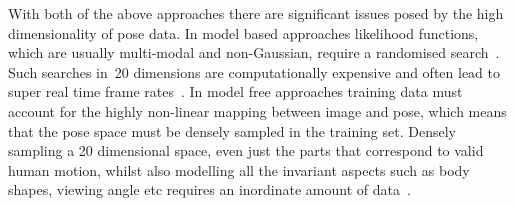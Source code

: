 \documentclass[11pt]{article} %
\begin{document}
With both of the above approaches there are significant issues posed by the high dimensionality of pose data. In model based approaches likelihood functions, which are usually multi-modal and non-Gaussian, require a randomised search~\cite{Sminchisescu2003}. Such searches in~20 dimensions are computationally expensive and often lead to super real time frame rates~\cite{Hen2009}. In model free approaches training data must account for the highly non-linear mapping between image and pose, which means that the pose space must be densely sampled in the training set. Densely sampling a 20 dimensional space, even just the parts that correspond to valid human motion, whilst also modelling all the invariant aspects such as body shapes, viewing angle etc requires an inordinate amount of data~\cite{Hen2009,Agarwal2006}.%
\end{document}
